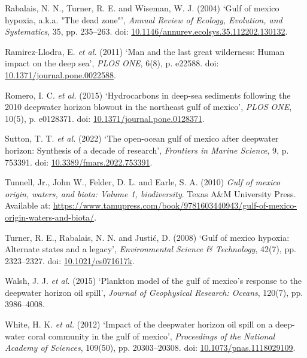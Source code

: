 \documentclass[
  11pt,
]{article}
\newlength{\cslhangindent}
\newenvironment{CSLReferences}[2] %
 {\begin{list}{}{%
  \setlength{\itemindent}{0pt}
  \setlength{\leftmargin}{0pt}
  \setlength{\parsep}{0pt}
  \ifodd #1
   \setlength{\leftmargin}{\cslhangindent}
   \setlength{\itemindent}{-1\cslhangindent}
  \fi
  \setlength{\itemsep}{#2\baselineskip}}}
 {\end{list}}
\begin{document}
\begin{CSLReferences}{0}{1}
Rabalais, N. N., Turner, R. E. and Wiseman, W. J. (2004) {`Gulf of
mexico hypoxia, a.k.a. "The dead zone"'}, \emph{Annual Review of
Ecology, Evolution, and Systematics}, 35, pp. 235--263. doi:
\href{https://doi.org/10.1146/annurev.ecolsys.35.112202.130132}{10.1146/annurev.ecolsys.35.112202.130132}.

Ramirez-Llodra, E. \emph{et al.} (2011) {`Man and the last great
wilderness: Human impact on the deep sea'}, \emph{PLOS ONE}, 6(8), p.
e22588. doi:
\href{https://doi.org/10.1371/journal.pone.0022588}{10.1371/journal.pone.0022588}.

Romero, I. C. \emph{et al.} (2015) {`Hydrocarbons in deep-sea sediments
following the 2010 deepwater horizon blowout in the northeast gulf of
mexico'}, \emph{PLOS ONE}, 10(5), p. e0128371. doi:
\href{https://doi.org/10.1371/journal.pone.0128371}{10.1371/journal.pone.0128371}.

Sutton, T. T. \emph{et al.} (2022) {`The open-ocean gulf of mexico after
deepwater horizon: Synthesis of a decade of research'}, \emph{Frontiers
in Marine Science}, 9, p. 753391. doi:
\href{https://doi.org/10.3389/fmars.2022.753391}{10.3389/fmars.2022.753391}.

Tunnell, Jr., John W., Felder, D. L. and Earle, S. A. (2010) \emph{Gulf
of mexico origin, waters, and biota: Volume 1, biodiversity}. Texas A\&M
University Press. Available at:
\url{https://www.tamupress.com/book/9781603440943/gulf-of-mexico-origin-waters-and-biota/}.

Turner, R. E., Rabalais, N. N. and Justić, D. (2008) {`Gulf of mexico
hypoxia: Alternate states and a legacy'}, \emph{Environmental Science \&
Technology}, 42(7), pp. 2323--2327. doi:
\href{https://doi.org/10.1021/es071617k}{10.1021/es071617k}.

Walsh, J. J. \emph{et al.} (2015) {`Plankton model of the gulf of
mexico's response to the deepwater horizon oil spill'}, \emph{Journal of
Geophysical Research: Oceans}, 120(7), pp. 3986--4008.

White, H. K. \emph{et al.} (2012) {`Impact of the deepwater horizon oil
spill on a deep-water coral community in the gulf of mexico'},
\emph{Proceedings of the National Academy of Sciences}, 109(50), pp.
20303--20308. doi:
\href{https://doi.org/10.1073/pnas.1118029109}{10.1073/pnas.1118029109}.

\end{CSLReferences}
\end{document}

